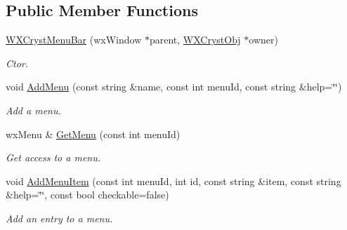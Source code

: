 \subsection*{Public Member Functions}
\begin{DoxyCompactItemize}
\item 
\mbox{\label{class_obj_cryst_1_1_w_x_cryst_menu_bar_aaa68b57dce657185fe3a93c19ecc648a}} 
\mbox{\hyperlink{class_obj_cryst_1_1_w_x_cryst_menu_bar_aaa68b57dce657185fe3a93c19ecc648a}{W\+X\+Cryst\+Menu\+Bar}} (wx\+Window $\ast$parent, \mbox{\hyperlink{class_obj_cryst_1_1_w_x_cryst_obj}{W\+X\+Cryst\+Obj}} $\ast$owner)
\begin{DoxyCompactList}\small\item\em Ctor. \end{DoxyCompactList}\item 
\mbox{\label{class_obj_cryst_1_1_w_x_cryst_menu_bar_a99b2ca415d2bb4b670433557b1d42a5d}} 
void \mbox{\hyperlink{class_obj_cryst_1_1_w_x_cryst_menu_bar_a99b2ca415d2bb4b670433557b1d42a5d}{Add\+Menu}} (const string \&name, const int menu\+Id, const string \&help=\char`\"{}\char`\"{})
\begin{DoxyCompactList}\small\item\em Add a menu. \end{DoxyCompactList}\item 
\mbox{\label{class_obj_cryst_1_1_w_x_cryst_menu_bar_a4bf76669c243be739b48df3e9f508ea6}} 
wx\+Menu \& \mbox{\hyperlink{class_obj_cryst_1_1_w_x_cryst_menu_bar_a4bf76669c243be739b48df3e9f508ea6}{Get\+Menu}} (const int menu\+Id)
\begin{DoxyCompactList}\small\item\em Get access to a menu. \end{DoxyCompactList}\item 
\mbox{\label{class_obj_cryst_1_1_w_x_cryst_menu_bar_a689d06fe301f17b5e8940286d107340a}} 
void \mbox{\hyperlink{class_obj_cryst_1_1_w_x_cryst_menu_bar_a689d06fe301f17b5e8940286d107340a}{Add\+Menu\+Item}} (const int menu\+Id, int id, const string \&item, const string \&help=\char`\"{}\char`\"{}, const bool checkable=false)
\begin{DoxyCompactList}\small\item\em Add an entry to a menu. \end{DoxyCompactList}\item 

\end{DoxyCompactItemize}
